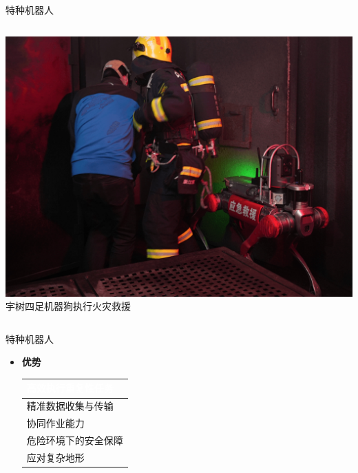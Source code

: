 \documentclass{beamer}
\begin{document}
\begin{frame}{特种机器人}
\begin{columns}[c, onlytextwidth]
\begin{column}{0.265\textwidth}
\centering
\includegraphics[width=\textwidth, keepaspectratio]{military/3.jpg}
\smallskip
{\tiny 宇树四足机器狗执行火灾救援}
\end{column}

\end{columns}
\end{frame}

\begin{frame}{特种机器人}
\setlength{\leftmargini}{0mm}
\begin{itemize}
\item \textbf{优势}
\smallskip
\smallskip
\newline
\renewcommand{\arraystretch}{1.35}
\begin{tabular}{p{50mm}}
\hline
\rowcolor{KeyBlue}
\textcolor{white}{
\small 高效执行重复性任务} \\
\hline
\rowcolor{Blue1}
\small 精准数据收集与传输 \\
\hline
\rowcolor{Blue2}
\small 协同作业能力 \\
\hline
\rowcolor{Blue1}
\small 危险环境下的安全保障 \\
\hline
\rowcolor{Blue2}
\small 应对复杂地形 \\
\hline
\end{tabular}
\end{itemize}
\end{frame}
\end{document}
